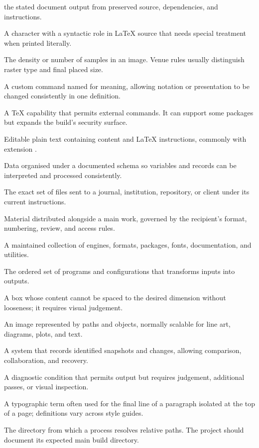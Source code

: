 \begin{description}[style=nextline,leftmargin=1.6em,itemsep=0.75em]
        the stated document output from preserved source, dependencies, and
        instructions.
  \item[Reserved character] A character with a syntactic role in \LaTeX{} source
        that needs special treatment when printed literally.
  \item[Resolution] The density or number of samples in an image. Venue rules
        usually distinguish raster type and final placed size.
  \item[Semantic command] A custom command named for meaning, allowing notation
        or presentation to be changed consistently in one definition.
  \item[Shell escape] A TeX capability that permits external commands. It can
        support some packages but expands the build's security surface.
  \item[Source file] Editable plain text containing content and \LaTeX{}
        instructions, commonly with extension .
  \item[Structured data] Data organised under a documented schema so variables
        and records can be interpreted and processed consistently.
  \item[Submission package] The exact set of files sent to a journal,
        institution, repository, or client under its current instructions.
  \item[Supplementary information] Material distributed alongside a main work,
        governed by the recipient's format, numbering, review, and access rules.
  \item[TeX distribution] A maintained collection of engines, formats, packages,
        fonts, documentation, and utilities.
  \item[Toolchain] The ordered set of programs and configurations that transforms
        inputs into outputs.
  \item[Underfull box] A box whose content cannot be spaced to the desired
        dimension without looseness; it requires visual judgement.
  \item[Vector graphic] An image represented by paths and objects, normally
        scalable for line art, diagrams, plots, and text.
  \item[Version control] A system that records identified snapshots and changes,
        allowing comparison, collaboration, and recovery.
  \item[Warning] A diagnostic condition that permits output but requires
        judgement, additional passes, or visual inspection.
  \item[Widow] A typographic term often used for the final line of a paragraph
        isolated at the top of a page; definitions vary across style guides.
  \item[Working directory] The directory from which a process resolves relative
        paths. The project should document its expected main build directory.
\end{description}
